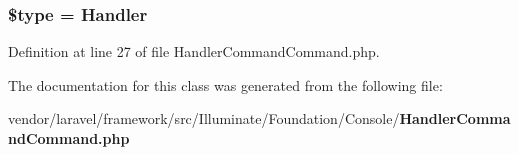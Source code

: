\subsubsection[{\$type}]{\setlength{\rightskip}{0pt plus 5cm}\$type = \textquotesingle{}Handler\textquotesingle{}\hspace{0.3cm}{\ttfamily [protected]}}\label{class_illuminate_1_1_foundation_1_1_console_1_1_handler_command_command_a9a4a6fba2208984cabb3afacadf33919}


Definition at line 27 of file Handler\+Command\+Command.\+php.



The documentation for this class was generated from the following file\+:\begin{DoxyCompactItemize}
\item 
vendor/laravel/framework/src/\+Illuminate/\+Foundation/\+Console/{\bf Handler\+Command\+Command.\+php}\end{DoxyCompactItemize}
